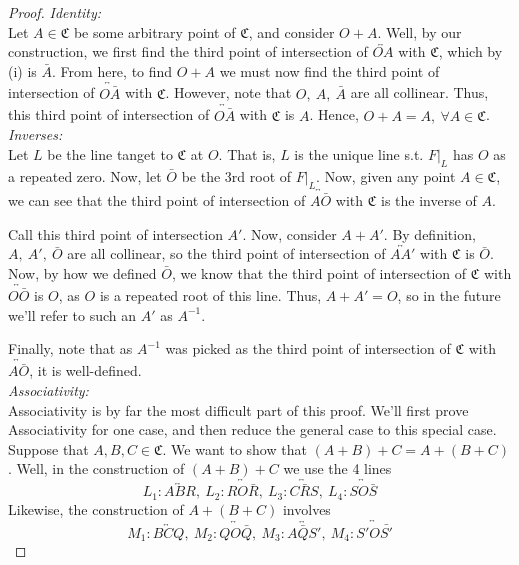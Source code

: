 \begin{proof}
\emph{Identity:}\\
Let $A \in \mathfrak{C}$ be some arbitrary point of $\mathfrak{C}$, and consider $O+A$.
Well, by our construction, we first find the third point
of intersection of $\overleftrightarrow{OA}$ with $\mathfrak{C}$, which by (i)
is $\bar{A}$. From here, to find $O+A$ we must now find the
third point of intersection of $\overleftrightarrow{O\bar{A}}$ with $\mathfrak{C}$. However, note
that $O,~A,~\bar{A}$ are all collinear. Thus, this third point
of intersection of $\overleftrightarrow{O\bar{A}}$ with $\mathfrak{C}$ is $A$. Hence, $O+A=A,~\forall A \in \mathfrak{C}$.\\

\emph{Inverses:}\\
Let $L$ be the line tanget to $\mathfrak{C}$ at $O$. That is, $L$ is the unique line s.t.
$F|_L$ has $O$ as a repeated zero. Now, let $\bar{O}$ be the 3rd root of $F|_L$.
Now, given any point $A \in \mathfrak{C}$, we can see that the third point of intersection
of $\overleftrightarrow{A\bar{O}}$ with $\mathfrak{C}$ is the inverse of $A$.

Call this third point of intersection $A'$. Now, consider $A+A'$. By definition,
$A,~A',~\bar{O}$ are all collinear, so the third point of intersection of 
$\overleftrightarrow{AA'}$ with $\mathfrak{C}$ is $\bar{O}$. Now, by how we defined
$\bar{O}$, we know that the third point of intersection of $\mathfrak{C}$ with $\overleftrightarrow{O\bar{O}}$
is $O$, as $O$ is a repeated root of this line. Thus, $A+A' = O$, so in the
future we'll refer to such an $A'$ as $A^{-1}$.

Finally, note that as $A^{-1}$ was picked as the third point of intersection of
$\mathfrak{C}$ with $\overleftrightarrow{A\bar{O}}$, it is well-defined.\\

\emph{Associativity:}\\
Associativity is by far the most difficult part of this proof. We'll first prove 
Associativity for one case, and then reduce the general case to this special case.\\

Suppose that $A,B,C \in \mathfrak{C}$. We want to show that $(A+B)+C = A+(B+C)$.
Well, in the construction of $(A+B)+C$ we use the 4 lines
\[
L_1: \overleftrightarrow{ABR},~L_2: \overleftrightarrow{RO\bar{R}},~L_3: \overleftrightarrow{C\bar{R}S},~L_4: \overleftrightarrow{SO\bar{S}}
\]
Likewise, the construction of $A+(B+C)$ involves
\[
M_1: \overleftrightarrow{BCQ},~M_2: \overleftrightarrow{QO\bar{Q}},~M_3: \overleftrightarrow{A\bar{Q}S'},~M_4: \overleftrightarrow{S'O\bar{S'}}
\]


\end{proof}
